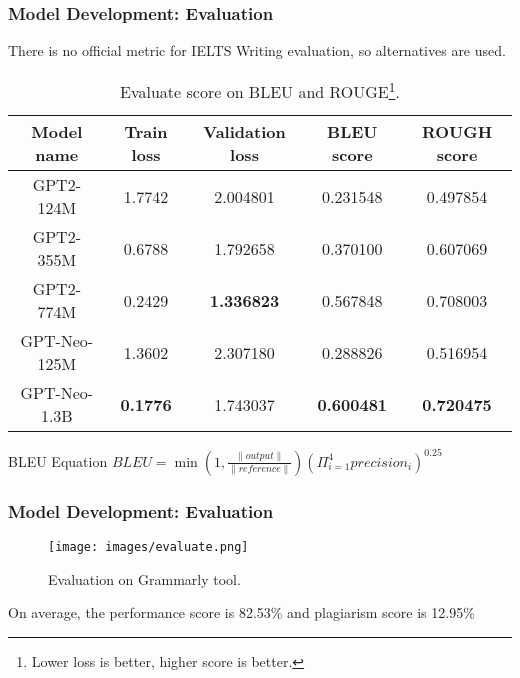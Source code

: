 \documentclass[10pt]{beamer}
\begin{document}


\begin{frame}
\frametitle{Model Development: Evaluation}

There is \alert{no official metric} for IELTS Writing evaluation, so alternatives are used.

\pause

\begin{table}
\begin{tabular}{c c c c c}
\toprule
\textbf{Model name} & \textbf{Train loss} & \textbf{Validation loss} & \textbf{BLEU score } & \textbf{ROUGH score}\\
\midrule
 GPT2-124M & 1.7742 & 2.004801 & 0.231548 & 0.497854 \\
 GPT2-355M & 0.6788 & 1.792658 & 0.370100 & 0.607069 \\
 GPT2-774M & 0.2429 & \textbf{1.336823} & 0.567848 & 0.708003 \\
 GPT-Neo-125M & 1.3602 & 2.307180 & 0.288826 & 0.516954 \\
 GPT-Neo-1.3B & \textbf{0.1776} & 1.743037 & \textbf{0.600481} & \textbf{0.720475} \\
\bottomrule
\end{tabular}
\caption{Evaluate score on BLEU and ROUGE\footnote{Lower loss is better, higher score is better.}.}
\label{table:Evaluate score on BLEU and ROUGE}

\end{table}
\pause
\begin{block}{BLEU Equation}
\centering
    $BLEU=\min \left (1,\frac{\|output\|}{\|reference\|} \right) \left ( \Pi_{i=1}^4 precision_i \right )^{0.25}$
\end{block}

\end{frame}




\begin{frame}
\frametitle{Model Development: Evaluation}

\begin{figure}
\texttt{[image: images/evaluate.png]}
\caption{Evaluation on Grammarly tool.}
\label{table:Evaluation on Grammarly tool}
\end{figure}

On average, the performance score is 82.53\% and plagiarism
score is 12.95\%

\end{frame}
\end{document}
